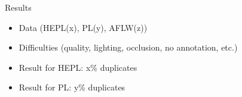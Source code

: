 

\begin{xpsectionbox}{Results}{}

\begin{itemize}
	\item Data (HEPL(x), PL(y), AFLW(z))
	\item Difficulties (quality, lighting, occlusion, no annotation, etc.)
	\item Result for HEPL: x\% duplicates
	\item Result for PL: y\% duplicates 
		
\end{itemize}
\end{xpsectionbox}